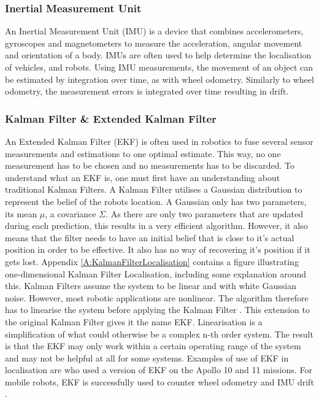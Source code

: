 \subsubsection{Inertial Measurement Unit}
An Inertial Measurement Unit (IMU) is a device that combines accelerometers, gyroscopes and magnetometers to measure the acceleration, angular movement and orientation of a body. IMUs are often used to help determine the localisation of vehicles, and robots. Using IMU measurements, the movement of an object can be estimated by integration over time, as with wheel odometry. Similarly to wheel odometry, the measurement errors is integrated over time resulting in drift.


\subsubsection{Kalman Filter \& Extended Kalman Filter}
An Extended Kalman Filter (EKF) is often used in robotics to fuse several sensor measurements and estimations to one optimal estimate. This way, no one measurement has to be chosen and no measurements has to be discarded. To understand what an EKF is, one must first have an understanding about traditional Kalman Filters. A Kalman Filter utilises a Gaussian distribution to represent the belief of the robots location. A Gaussian only has two parameters, its mean $\mu$, a covariance $\Sigma$. As there are only two parameters that are updated during each prediction, this results in a very efficient algorithm. However, it also means that the filter needs to have an initial belief that is close to it's actual position in order to be effective. It also has no way of recovering it's position if it gets lost. Appendix \ref{A:KalmanFilterLocalisation} contains a figure illustrating one-dimensional Kalman Filter Localisation, including some explanation around this.
Kalman Filters assume the system to be linear and with white Gaussian noise. However, most robotic applications are nonlinear. The algorithm therefore has to linearise the system before applying the Kalman Filter \cite{SiegwartRoland2011Itam}. This extension to the original Kalman Filter gives it the name EKF. Linearisation is a simplification of what could otherwise be a complex n-th order system. The result is that the EKF may only work within a certain operating range of the system and may not be helpful at all for some systems. %
Examples of use of EKF in localisation are \cite{ApolloEKF1973} who used a version of EKF on the Apollo 10 and 11 missions. For mobile robots, EKF is successfully used to counter wheel odometry and IMU drift \cite{Chen2012}.

